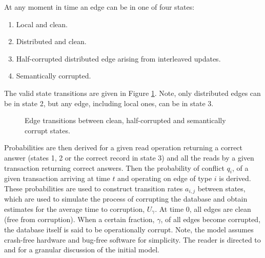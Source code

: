 \documentclass[sigplan,10pt]{acmart}
\begin{document}
At any moment in time an edge can be in one of four states:
\begin{enumerate}
\item Local and clean.
\item Distributed and clean.
\item Half-corrupted distributed edge arising from interleaved updates.
\item Semantically corrupted.
\end{enumerate}
The valid state transitions are given in Figure \ref{state-transitions}. Note, only distributed edges can be in state 2, but any edge, including local ones, can be in state 3.

\begin{figure}[ht]
  \centering
    \caption{Edge transitions between clean, half-corrupted and semantically corrupt states.}
    \label{state-transitions}
\end{figure}

Probabilities are then derived for a given read operation returning a correct answer (states 1, 2 or the correct record in state 3) and all the reads by a given transaction returning correct answers. Then the probability of conflict $q_i$, of a given transaction arriving at time $t$ and operating on edge of type $i$ is derived. These probabilities are used to construct transition rates $a_{i,j}$ between states, which are used to simulate the process of corrupting the database and obtain estimates for the average time to corruption, $U_{\gamma}$. At time $0$, all edges are clean (free from corruption). When a certain fraction, $\gamma$, of all edges become corrupted, the database itself is said to be operationally corrupt.  Note, the model assumes crash-free hardware and bug-free software for simplicity. The reader is directed to \cite{Ezhilchelvan2018} and \cite{Webber2019} for a granular discussion of the initial model.
\end{document}
